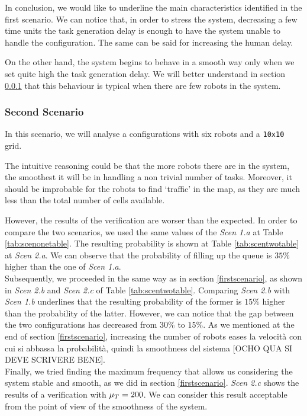 In conclusion, we would like to underline the main characteristics identified in the first scenario. We can notice that, in order to stress the system, decreasing a few time units the task generation delay is enough to have the system unable to handle the configuration. The same can be said for increasing the human delay.

On the other hand, the system begins to behave in a smooth way only when we set quite high the task generation delay. We will better understand in section \ref{secondscenario} that this behaviour is typical when there are few robots in the system.

\subsubsection{Second Scenario} \label{secondscenario}
In this scenario, we will analyse a configurations with six robots and a \texttt{10x10} grid.

The intuitive reasoning could be that the more robots there are in the system, the smoothest it will be in handling a non trivial number of tasks. Moreover, it should be improbable for the robots to find `traffic' in the map, as they are much less than the total number of cells available.

However, the results of the verification are worser than the expected. In order to compare the two scenarios, we used the same values of the \emph{Scen 1.a} at Table \ref{tab:scenonetable}. The resulting probability is shown at Table \ref{tab:scentwotable} at \emph{Scen 2.a}. We can observe that the probability of filling up the queue is $35\%$ higher than the one of \emph{Scen 1.a}.
\\

Subsequently, we proceeded in the same way as in section \ref{firstscenario}, as shown in \emph{Scen 2.b} and \emph{Scen 2.c} of Table \ref{tab:scentwotable}. Comparing \emph{Scen 2.b} with \emph{Scen 1.b} underlines that the resulting probability of the former is $15\%$ higher than the probability of the latter. However, we can notice that the gap between the two configurations has decreased from $30\%$ to $15\%$. As we mentioned at the end of section \ref{firstscenario}, increasing the number of robots eases la velocità con cui si abbassa la probabilità, quindi la smoothness del sistema [OCHO QUA SI DEVE SCRIVERE BENE].
\\

Finally, we tried finding the maximum frequency that allows us considering the system stable and smooth, as we did in section \ref{firstscenario}. \emph{Scen 2.c} shows the results of a verification with $\mu_T = 200$. We can consider this result acceptable from the point of view of the smoothness of the system.
\\

